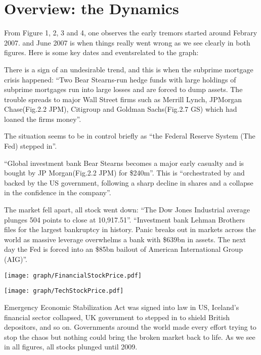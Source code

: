 \documentclass[11pt]{article}
\begin{document}
\section{Overview: the Dynamics}\vspace{-1em}
From Figure 1, 2, 3 and 4, one observes the early tremors started around Febrary 2007. and June 2007 is when things really went wrong as we see clearly in both figures. Here is some key dates and eventsrelated to the graph:
\begin{description}\vspace{-1em}
\item[Jun. 2008] There is a sign of an undesirable trend, and this is when the subprime mortgage crisis happened: ``Two Bear Stearns-run hedge funds with large holdings of subprime mortgages run into large losses and are forced to dump assets. The trouble spreads to major Wall Street firms such as Merrill Lynch, JPMorgan Chase(Fig.2.2 JPM), Citigroup and Goldman Sachs(Fig.2.7 GS) which had loaned the firms money''\cite{Guillen}.
\item[22 Jan. 2008] The situation seems to be in control briefly as ``the Federal Reserve System (The Fed) stepped in''\cite{Jolly}.
\item[14 Mar. 2008] ``Global investment bank Bear Stearns becomes a major early casualty and is bought by JP Morgan(Fig.2.2 JPM) for \$240m''\cite{Jolly}. This is ``orchestrated by and backed by the US government, following a sharp decline in shares and a collapse in the confidence in the company''\cite{Guillen}.
\item[15 Sep. 2008] The market fell apart, all stock went down: ``The Dow Jones Industrial average plunges 504 points to close at 10,917.51''\cite{Guillen}. ``Investment bank Lehman Brothers files for the largest bankruptcy in history. Panic breaks out in markets across the world as massive leverage overwhelms a bank with \$639bn in assets. The next day the Fed is forced into an \$85bn bailout of American International Group (AIG)''\cite{Jolly}.
\end{description}
\begin{center}
\texttt{[image: graph/FinancialStockPrice.pdf]}
\end{center}
\begin{center}
\texttt{[image: graph/TechStockPrice.pdf]}
\end{center}\vspace{-1em}
\begin{description}\vspace{-1em}
\item[Oct. 2008] Emergency Economic Stabilization Act was signed into law in US, Iceland’s financial sector collapsed, UK government to stepped in to shield British depositors, and so on. Governments around the world made every effort trying to stop the chaos but nothing could bring the broken market back to life. As we see in all figures, all stocks plunged until 2009.
\end{description}\vspace{-1em}
\end{document}
